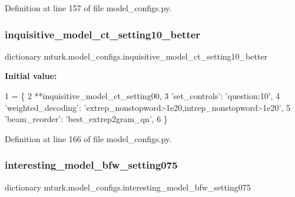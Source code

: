 Definition at line 157 of file model\+\_\+configs.\+py.

\mbox{\label{namespacemturk_1_1model__configs_a6e8e2eb9d28d188d09798284a617ba35}} 
\subsubsection{\texorpdfstring{inquisitive\+\_\+model\+\_\+ct\+\_\+setting10\+\_\+better}{inquisitive\_model\_ct\_setting10\_better}}
{\footnotesize\ttfamily dictionary mturk.\+model\+\_\+configs.\+inquisitive\+\_\+model\+\_\+ct\+\_\+setting10\+\_\+better}

{\bfseries Initial value\+:}
\begin{DoxyCode}
1 =  \{
2     **inquisitive\_model\_ct\_setting00,
3     \textcolor{stringliteral}{'set\_controls'}: \textcolor{stringliteral}{'question:10'},
4     \textcolor{stringliteral}{'weighted\_decoding'}: \textcolor{stringliteral}{'extrep\_nonstopword:-1e20,intrep\_nonstopword:-1e20'},
5     \textcolor{stringliteral}{'beam\_reorder'}: \textcolor{stringliteral}{'best\_extrep2gram\_qn'},
6 \}
\end{DoxyCode}


Definition at line 166 of file model\+\_\+configs.\+py.

\mbox{\label{namespacemturk_1_1model__configs_ac062c479f4cd03114eded2530c59fba7}} 
\subsubsection{\texorpdfstring{interesting\+\_\+model\+\_\+bfw\+\_\+setting075}{interesting\_model\_bfw\_setting075}}
{\footnotesize\ttfamily dictionary mturk.\+model\+\_\+configs.\+interesting\+\_\+model\+\_\+bfw\+\_\+setting075}

